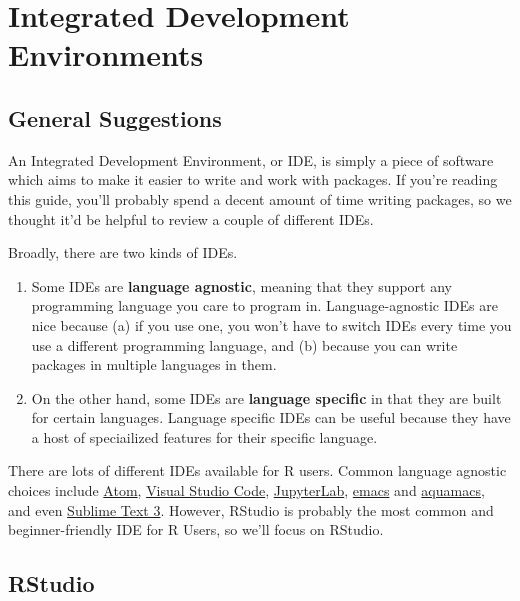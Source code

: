 \documentclass[
]{book}
\providecommand{\tightlist}{%
  \setlength{\itemsep}{0pt}\setlength{\parskip}{0pt}}
\begin{document}
\hypertarget{integrated-development-environments}{%
\chapter{Integrated Development Environments}\label{integrated-development-environments}}

\hypertarget{general-suggestions}{%
\section{General Suggestions}\label{general-suggestions}}

An Integrated Development Environment, or IDE, is simply a piece of software which aims to make it easier to write and work with packages. If you're reading this guide, you'll probably spend a decent amount of time writing packages, so we thought it'd be helpful to review a couple of different IDEs.

Broadly, there are two kinds of IDEs.

\begin{enumerate}
\def\labelenumi{\arabic{enumi}.}
\tightlist
\item
  Some IDEs are \textbf{language agnostic}, meaning that they support any programming language you care to program in. Language-agnostic IDEs are nice because (a) if you use one, you won't have to switch IDEs every time you use a different programming language, and (b) because you can write packages in multiple languages in them.
\item
  On the other hand, some IDEs are \textbf{language specific} in that they are built for certain languages. Language specific IDEs can be useful because they have a host of speciailized features for their specific language.
\end{enumerate}

There are lots of different IDEs available for R users. Common language agnostic choices include \href{https://atom.io/}{Atom}, \href{https://code.visualstudio.com/}{Visual Studio Code}, \href{https://github.com/jupyterlab}{JupyterLab}, \href{https://www.gnu.org/software/emacs/}{emacs} and \href{http://aquamacs.org/}{aquamacs}, and even \href{https://www.sublimetext.com/}{Sublime Text 3}. However, RStudio is probably the most common and beginner-friendly IDE for R Users, so we'll focus on RStudio.

\hypertarget{rstudio}{%
\section{RStudio}\label{rstudio}}
\end{document}
